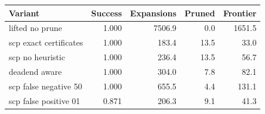 \begin{tabular}{lrrrr}
\toprule
Variant & Success & Expansions & Pruned & Frontier \\
\midrule
lifted no prune & 1.000 & 7506.9 & 0.0 & 1651.5 \\
scp exact certificates & 1.000 & 183.4 & 13.5 & 33.0 \\
scp no heuristic & 1.000 & 236.4 & 13.5 & 56.7 \\
deadend aware & 1.000 & 304.0 & 7.8 & 82.1 \\
scp false negative 50 & 1.000 & 655.5 & 4.4 & 131.1 \\
scp false positive 01 & 0.871 & 206.3 & 9.1 & 41.3 \\
\bottomrule
\end{tabular}
